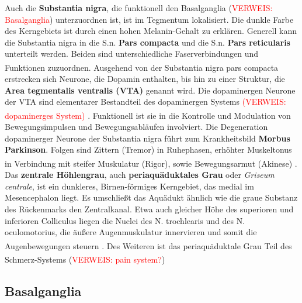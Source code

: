 \documentclass[12pt,a4paper,pdftex]{article}
\begin{document}
\noindent Auch die \textbf{Substantia nigra}, die funktionell den Basalganglia (\textcolor{red}{VERWEIS: Basalganglia}) unterzuordnen ist, ist im Tegmentum lokalisiert. Die dunkle Farbe des Kerngebiets ist durch einen hohen Melanin-Gehalt zu erklären. Generell kann die Substantia nigra in die S.n. \textbf{Pars compacta} und die S.n. \textbf{Pars reticularis} unterteilt werden. Beiden sind unterschiedliche Faserverbindungen und Funktionen zuzuordnen\textsuperscript{\cite[6]{trepel2011neuroanatomie}}. 
Ausgehend von der Substantia nigra pars compacta erstrecken sich Neurone, die Dopamin enthalten, bis hin zu einer Struktur, die \textbf{Area tegmentalis ventralis (VTA)} genannt wird. Die dopaminergen Neurone der VTA sind elementarer Bestandteil des dopaminergen Systems \textcolor{red}{(VERWEIS: dopaminerges System)} \textsuperscript{\cite[9]{crossman2014neuroanatomy}}. Funktionell ist sie in die Kontrolle und Modulation von Bewegungsimpulsen und Bewegungsabläufen involviert. Die Degeneration dopaminerger Neurone der Substantia nigra führt zum Krankheitsbild \textbf{Morbus Parkinson}. Folgen sind Zittern (Tremor) in Ruhephasen, erhöhter Muskeltonus in Verbindung mit steifer Muskulatur (Rigor), sowie Bewegungsarmut (Akinese) \textsuperscript{\cite[6]{trepel2011neuroanatomie}}. \\

\noindent Das \textbf{zentrale Höhlengrau}, auch \textbf{periaquäduktales Grau} oder \textit{Griseum centrale}, ist ein dunkleres, Birnen-förmiges  Kerngebiet, das medial im Mesencephalon liegt. Es umschließt das Aquädukt ähnlich wie die graue Substanz des Rückenmarks den Zentralkanal. Etwa auch gleicher Höhe des superioren und inferioren Colliculus liegen die Nuclei des N. trochlearis und des N. oculomotorius, die äußere Augenmuskulatur innervieren und somit die Augenbewegungen steuern \textsuperscript{\cite[9]{crossman2014neuroanatomy}}. Des Weiteren ist das periaquäduktale Grau Teil des Schmerz-Systems (\textcolor{red}{VERWEIS: pain system?}) \textsuperscript{\cite[25]{paxinos2014rat}}


\subsection{Basalganglia}
\label{subsec:Basalganglia} 
\end{document}
